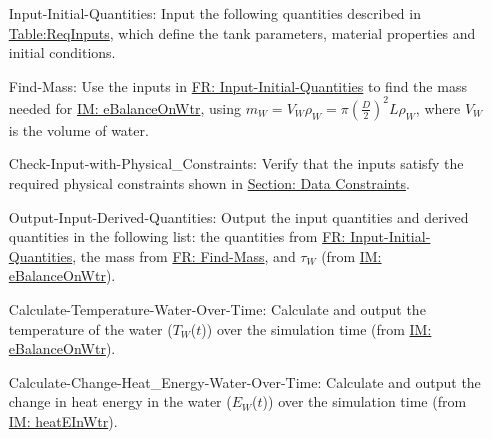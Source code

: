 \documentclass[12pt]{article}
\begin{document}
\begin{itemize}
\item[Input-Initial-Quantities:\phantomsection\label{inputInitQuants}]Input the following quantities described in \hyperref[Table:ReqInputs]{Table:ReqInputs}, which define the tank parameters, material properties and initial conditions.
\item[Find-Mass:\phantomsection\label{findMass}]Use the inputs in \hyperref[inputInitQuants]{FR: Input-Initial-Quantities} to find the mass needed for \hyperref[IM:eBalanceOnWtr]{IM: eBalanceOnWtr}, using ${m_{W}}={V_{W}} {ρ_{W}}=π \left(\frac{D}{2}\right)^{2} L {ρ_{W}}$, where ${V_{W}}$ is the volume of water.
\item[Check-Input-with-Physical\_Constraints:\phantomsection\label{checkWithPhysConsts}]Verify that the inputs satisfy the required physical constraints shown in \hyperref[Sec:DataConstraints]{Section: Data Constraints}.
\item[Output-Input-Derived-Quantities:\phantomsection\label{outputInputDerivQuants}]Output the input quantities and derived quantities in the following list: the quantities from \hyperref[inputInitQuants]{FR: Input-Initial-Quantities}, the mass from \hyperref[findMass]{FR: Find-Mass}, and ${τ_{W}}$ (from \hyperref[IM:eBalanceOnWtr]{IM: eBalanceOnWtr}).
\item[Calculate-Temperature-Water-Over-Time:\phantomsection\label{calcTempWtrOverTime}]Calculate and output the temperature of the water (${T_{W}}$($t$)) over the simulation time (from \hyperref[IM:eBalanceOnWtr]{IM: eBalanceOnWtr}).
\item[Calculate-Change-Heat\_Energy-Water-Over-Time:\phantomsection\label{calcChgHeatEnergyWtrOverTime}]Calculate and output the change in heat energy in the water (${E_{W}}$($t$)) over the simulation time (from \hyperref[IM:heatEInWtr]{IM: heatEInWtr}).
\end{itemize}
\end{document}
